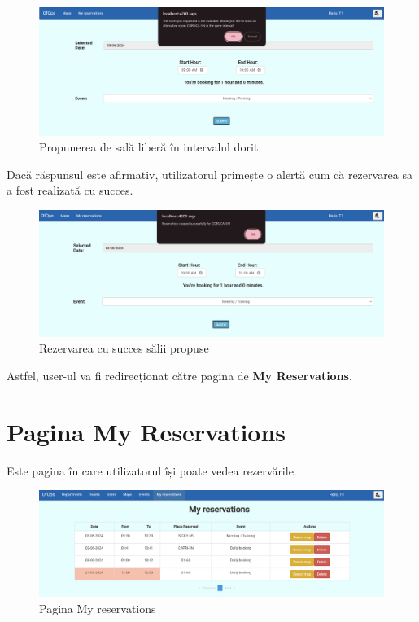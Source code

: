 \begin{figure}[!htb]
    \centering
    \includegraphics[width=0.9\linewidth]{images/sicily rezerv2.png}
    \caption{Propunerea de sală liberă în intervalul dorit}
    \label{fig:sicily rezerv2.png}
\end{figure}

Dacă răspunsul este afirmativ, utilizatorul primește o alertă cum că rezervarea sa a fost realizată cu succes.

\begin{figure}[!htb]
    \centering
    \includegraphics[width=0.9\linewidth]{images/sicily rezerv3.png}
    \caption{Rezervarea cu succes sălii propuse}
    \label{fig:sicily rezerv3.png}
\end{figure}

Astfel, user-ul va fi redirecționat către pagina de 
\textbf{My Reservations}.

\section{Pagina My Reservations}

Este pagina în care utilizatorul își poate vedea rezervările.

\begin{figure}[!htb]
    \centering
    \includegraphics[width=0.9\linewidth]{images/myres.png}
    \caption{Pagina My reservations}
    \label{fig:myres}
\end{figure}

